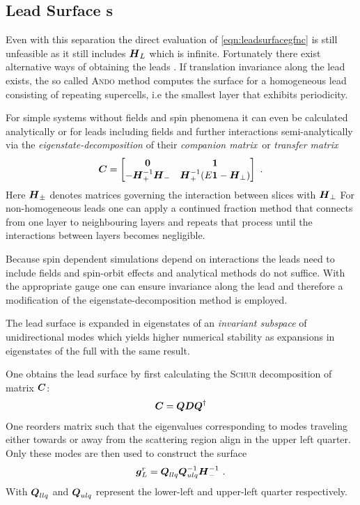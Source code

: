 \subsection{Lead Surface \cgfnc s}
Even with this separation the direct evaluation of \cref{eqn:leadsurfacegfnc} is still unfeasible as it still includes $\boldsymbol{H}_L$ which is infinite. Fortunately there exist alternative ways of obtaining the leads \gfnc{}.
If translation invariance along the lead exists, the so called \textsc{Ando} method \cite{PhysRevB.44.8017} computes the surface \gfnc{} for a homogeneous lead consisting of repeating supercells, i.e the smallest layer that exhibits periodicity.\par
For simple systems without fields and spin phenomena it can even be calculated analytically \cite{Datta1997} or for leads including fields and further interactions semi-analytically via the \emph{eigenstate-decomposition} of their \emph{companion matrix}\,\cite{PhysRevB.25.3975} or \emph{transfer matrix} \cite{PhysRevB.55.5266} \cite{PhysRevB.66.205319}
\begin{align}
  \boldsymbol{C} =
  \begin{bmatrix}
  \boldsymbol{0}  &\boldsymbol{1} \\
  -\boldsymbol{H}_{+}^{-1}\boldsymbol{H}_{-} &\boldsymbol{H}_{+}^{-1} (E\boldsymbol{1} - \boldsymbol{H}_{\perp})
  \end{bmatrix}\ .
  \label{eqn:companionmatrix}
\end{align}
Here $\boldsymbol{H}_{\pm}$ denotes matrices governing the interaction between slices with \hamil{} $\boldsymbol{H}_{\perp}$
For non-homogeneous leads one can apply a continued fraction method \cite{Velev2004} that connects \gfnc{} from one layer to neighbouring layers and repeats that process until the interactions between layers becomes negligible.\par
Because spin dependent simulations depend on interactions the leads need to include fields and spin-orbit effects and analytical methods do not suffice. With the appropriate gauge one can ensure invariance along the lead and therefore a modification of the eigenstate-decomposition method is employed.\par
The lead surface \gfnc{} is expanded in eigenstates of an \emph{invariant subspace} of unidirectional modes which yields higher numerical stability as expansions in eigenstates of the full \hamil{} with the same result\cite{Wimmer2009JComPhys}.\par
One obtains the lead surface \gfnc{} by first calculating the \textsc{Schur} decomposition of matrix $\boldsymbol{C}$:
\begin{align}
\boldsymbol{C} = \boldsymbol{Q}\boldsymbol{D}\boldsymbol{Q}^{\dagger}
\label{eqn:schurdecomposition}
\end{align}
One reorders matrix  such that the eigenvalues corresponding to modes traveling either towards or away from the scattering region align in the upper left quarter. Only these modes are then used to construct the surface \gfnc{}
\begin{align}
\boldsymbol{g}^r_L = \boldsymbol{Q}_{llq}\boldsymbol{Q}_{ulq}^{-1}\boldsymbol{H}_{-}^{-1}\ .
\end{align}
With $\boldsymbol{Q}_{llq}$ and $\boldsymbol{Q}_{ulq}$ represent the lower-left and upper-left quarter respectively. 
